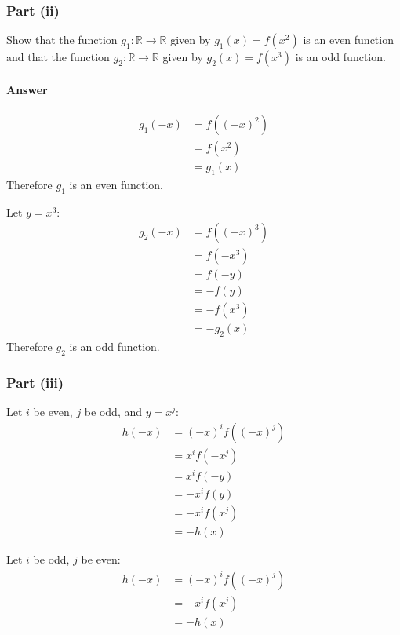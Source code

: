 \subsubsection{Part (ii)}
Show that the function $ g_1 : \mathbb{R} \rightarrow \mathbb{R} $ given by $ g_1(x) = f(x^2) $ is an even function and that the function $ g_2 : \mathbb{R} \rightarrow \mathbb{R} $ given by $ g_2(x) = f(x^3) $ is an odd function.

\paragraph{Answer}
\begin{align*}
    g_1(-x) &= f((-x)^2) \\
            &= f(x^2) \\
            &= g_1(x)
\end{align*}
Therefore $ g_1 $ is an even function.

Let $ y = x^3 $:
\begin{align*}
    g_2(-x) &= f((-x)^3) \\
            &= f(-x^3) \\
            &= f(-y) \\
            &= -f(y) \\
            &= -f(x^3) \\
            &= -g_2(x)
\end{align*}
Therefore $ g_2 $ is an odd function.

\subsubsection{Part (iii)}
Let $ i $ be even, $ j $ be odd, and $ y = x^j $:
\begin{align*}
    h(-x) &= (-x)^i f((-x)^j) \\
          &= x^i f(-x^j) \\
          &= x^i f(-y) \\
          &= -x^i f(y) \\
          &= -x^i f(x^j) \\
          &= -h(x)
\end{align*}

Let $ i $ be odd, $ j $ be even:
\begin{align*}
    h(-x) &= (-x)^i f((-x)^j) \\
          &= -x^i f(x^j) \\
          &= -h(x)
\end{align*}

